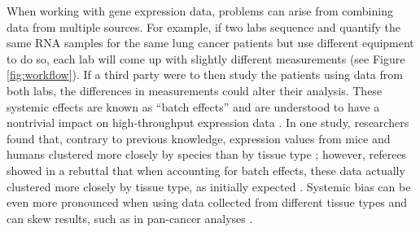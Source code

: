 \documentclass[notitlepage]{article}
\begin{document}
When working with gene expression data, problems can arise from combining data from multiple sources.
For example, if two labs sequence and quantify the same RNA samples for the same lung cancer patients but use different equipment to do so, each lab will come up with slightly different measurements (see Figure \ref{fig:workflow}).
If a third party were to then study the patients using data from both labs, the differences in measurements could alter their analysis.
These systemic effects are known as ``batch effects'' and are understood to have a nontrivial impact on high-throughput expression data \citep{leek_tackling_2010}.
In one study, researchers found that, contrary to previous knowledge, expression values from mice and humans clustered more closely by species than by tissue type \citep{yue_comparative_2014};
however, referees showed in a rebuttal that when accounting for batch effects, these data actually clustered more closely by tissue type, as initially expected \citep{gilad_reanalysis_2015}.
Systemic bias can be even more pronounced when using data collected from different tissue types and can skew results, such as in pan-cancer analyses \citep{dayton_classifying_2017-1}.
\end{document}

